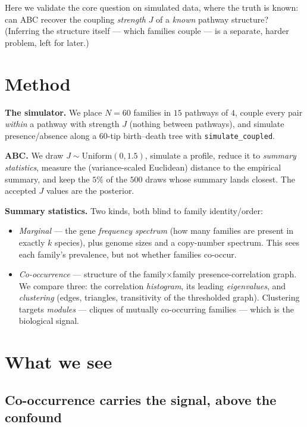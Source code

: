 \documentclass[11pt]{article}
\begin{document}
Here we validate the core question on simulated data, where the truth is known: can ABC recover
the coupling \emph{strength} $J$ of a \emph{known} pathway structure? (Inferring the structure
itself --- which families couple --- is a separate, harder problem, left for later.)

\section{Method}

\textbf{The simulator.} We place $N=60$ families in $15$ pathways of $4$, couple every pair
\emph{within} a pathway with strength $J$ (nothing between pathways), and simulate presence/absence
along a $60$-tip birth--death tree with \texttt{simulate\_coupled}.

\textbf{ABC.} We draw $J\sim\mathrm{Uniform}(0,1.5)$, simulate a profile, reduce it to
\emph{summary statistics}, measure the (variance-scaled Euclidean) distance to the empirical
summary, and keep the $5\%$ of the $500$ draws whose summary lands closest. The accepted $J$
values are the posterior.

\textbf{Summary statistics.} Two kinds, both blind to family identity/order:
\begin{itemize}\setlength\itemsep{0.1em}
\item \emph{Marginal} --- the gene \emph{frequency spectrum} (how many families are present in
exactly $k$ species), plus genome sizes and a copy-number spectrum. This sees each family's
prevalence, but not whether families co-occur.
\item \emph{Co-occurrence} --- structure of the family$\times$family presence-correlation graph.
We compare three: the correlation \emph{histogram}, its leading \emph{eigenvalues}, and
\emph{clustering} (edges, triangles, transitivity of the thresholded graph). Clustering targets
\emph{modules} --- cliques of mutually co-occurring families --- which is the biological signal.
\end{itemize}

\section{What we see}

\subsection{Co-occurrence carries the signal, above the confound}
\end{document}
